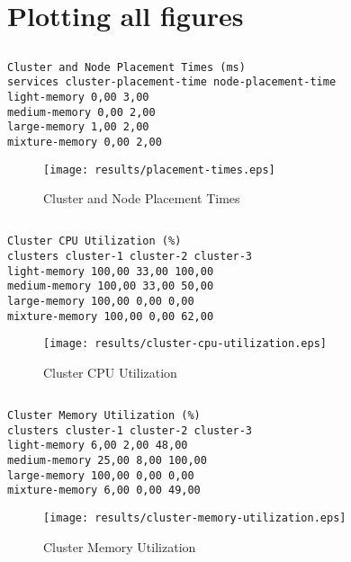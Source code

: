 \documentclass{elsart}
\begin{document}
\section{Plotting all figures}
\subsection{}

\begin{lstlisting}[caption={Cluster and Node Placement Times}]
Cluster and Node Placement Times (ms)
services cluster-placement-time node-placement-time
light-memory 0,00 3,00
medium-memory 0,00 2,00
large-memory 1,00 2,00
mixture-memory 0,00 2,00
\end{lstlisting}

\begin{figure}[ht]
\centering
\texttt{[image: results/placement-times.eps]}
\caption{Cluster and Node Placement Times}\label{fig:placement-times.eps}
\end{figure}

\subsection{}

\begin{lstlisting}[caption={Cluster CPU Utilization}]
Cluster CPU Utilization (%)
clusters cluster-1 cluster-2 cluster-3
light-memory 100,00 33,00 100,00
medium-memory 100,00 33,00 50,00
large-memory 100,00 0,00 0,00
mixture-memory 100,00 0,00 62,00
\end{lstlisting}

\begin{figure}[ht]
\centering
\texttt{[image: results/cluster-cpu-utilization.eps]}
\caption{Cluster CPU Utilization}\label{fig:cluster-cpu-utilization.eps}
\end{figure}

\subsection{}

\begin{lstlisting}[caption={Cluster Memory Utilization}]
Cluster Memory Utilization (%)
clusters cluster-1 cluster-2 cluster-3
light-memory 6,00 2,00 48,00
medium-memory 25,00 8,00 100,00
large-memory 100,00 0,00 0,00
mixture-memory 6,00 0,00 49,00
\end{lstlisting}

\begin{figure}[ht]
\centering
\texttt{[image: results/cluster-memory-utilization.eps]}
\caption{Cluster Memory Utilization}\label{fig:cluster-memory-utilization.eps}
\end{figure}
\end{document}
